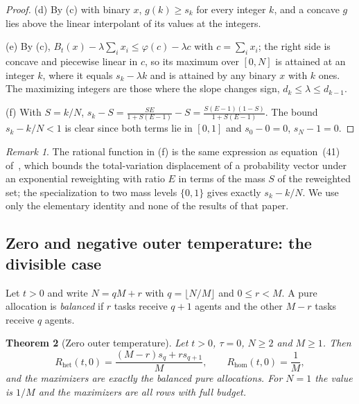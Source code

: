 \documentclass[11pt]{article}
\theoremstyle{plain}
\newtheorem{theorem}{Theorem}[section]
\theoremstyle{definition}
\theoremstyle{remark}
\newtheorem{remark}[theorem]{Remark}
\newcommand{\Rhet}{R_{\mathrm{het}}}
\newcommand{\Rhom}{R_{\mathrm{hom}}}
\begin{document}
\begin{proof}
(d) By (c) with binary $x$, $g(k)\ge s_k$ for every integer $k$, and a concave $g$ lies above the linear interpolant of its values at the integers.

(e) By (c), $B_t(x)-\lambda\sum_ix_i\le\varphi(c)-\lambda c$ with $c=\sum_ix_i$; the right side is concave and piecewise linear in $c$, so its maximum over $[0,N]$ is attained at an integer $k$, where it equals $s_k-\lambda k$ and is attained by any binary $x$ with $k$ ones. The maximizing integers are those where the slope changes sign, $d_k\le\lambda\le d_{k-1}$.

(f) With $S=k/N$, $s_k-S=\frac{SE}{1+S(E-1)}-S=\frac{S(E-1)(1-S)}{1+S(E-1)}$. The bound $s_k-k/N<1$ is clear since both terms lie in $[0,1]$ and $s_0-0=0$, $s_N-1=0$.
\end{proof}

\begin{remark}
The rational function in (f) is the same expression as equation~(41) of~\cite[Lemma~5.2]{CohenFausti}, which bounds the total-variation displacement of a probability vector under an exponential reweighting with ratio $E$ in terms of the mass $S$ of the reweighted set; the specialization to two mass levels $\{0,1\}$ gives exactly $s_k-k/N$. We use only the elementary identity and none of the results of that paper.
\end{remark}

\subsection{Zero and negative outer temperature: the divisible case}\label{sec:rect}

Let $t>0$ and write $N=qM+r$ with $q=\lfloor N/M\rfloor$ and $0\le r<M$. A pure allocation is \emph{balanced} if $r$ tasks receive $q+1$ agents and the other $M-r$ tasks receive $q$ agents.

\begin{theorem}[Zero outer temperature]\label{thm:rect}
Let $t>0$, $\tau=0$, $N\ge2$ and $M\ge1$. Then
\begin{equation}\label{eq:rect}
 \Rhet(t,0)=\frac{(M-r)s_q+rs_{q+1}}M,\qquad \Rhom(t,0)=\frac1M,
\end{equation}
and the maximizers are exactly the balanced pure allocations. For $N=1$ the value is $1/M$ and the maximizers are all rows with full budget.
\end{theorem}
\end{document}
